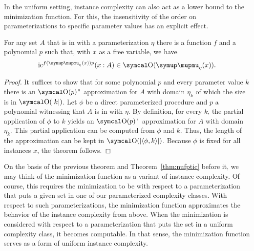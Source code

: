 In the uniform setting, instance complexity can also act as a lower bound to the minimization function.
For this, the insensitivity of the order on parameterizations to specific parameter values has an explicit effect.
\begin{theorem}
\label{thm:fptic}%
  For any set $A$ that is in  with a parameterization $\eta$ there is a function $f$ and a polynomial $p$ such that, with $x$ as a free variable, we have
  \begin{equation*}
    \ic^{f(\mu_\eta(x))p}(x : A) \in \bigO(\mu_\eta(x)).
  \end{equation*}
\end{theorem}
\begin{proof}
  It suffices to show that for some polynomial $p$ and every parameter value $k$ there is an $\bigO(p)$"~approximation for $A$ with domain $\eta_k$ of which the size is in $\bigO(\length{k})$.
  Let $\phi$ be a direct parameterized procedure and $p$ a polynomial witnessing that $A$ is in  with $\eta$.
  By definition, for every $k$, the partial application of $\phi$ to $k$ yields an $\bigO(p)$"~approximation for $A$ with domain $\eta_k$.
  This partial application can be computed from $\phi$ and $k$.
  Thus, the length of the approximation can be kept in $\bigO(\length{\pair{\phi}{k}})$.
  Because $\phi$ is fixed for all instances $x$, the theorem follows.
\end{proof}

On the basis of the previous theorem and Theorem~\ref{thm:nufptic} before it, we may think of the minimization function as a variant of instance complexity.
Of course, this requires the minimization to be with respect to a parameterization that puts a given set in one of our parameterized complexity classes.
With respect to such parameterizations, the minimization function approximates the behavior of the instance complexity from above.
When the minimization is considered with respect to a parameterization that puts the set in a uniform complexity class, it becomes computable.
In that sense, the minimization function serves as a form of uniform instance complexity.

